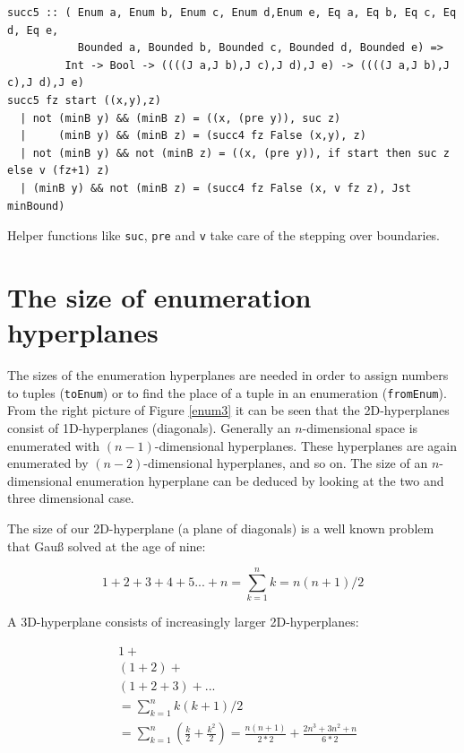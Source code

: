 \documentclass{tmr}
\begin{document}
\begin{Verbatim}
succ5 :: ( Enum a, Enum b, Enum c, Enum d,Enum e, Eq a, Eq b, Eq c, Eq d, Eq e,
           Bounded a, Bounded b, Bounded c, Bounded d, Bounded e) =>
         Int -> Bool -> ((((J a,J b),J c),J d),J e) -> ((((J a,J b),J c),J d),J e)
succ5 fz start ((x,y),z)
  | not (minB y) && (minB z) = ((x, (pre y)), suc z)
  |     (minB y) && (minB z) = (succ4 fz False (x,y), z)
  | not (minB y) && not (minB z) = ((x, (pre y)), if start then suc z else v (fz+1) z)
  | (minB y) && not (minB z) = (succ4 fz False (x, v fz z), Jst minBound)
\end{Verbatim}
Helper functions like \verb|suc|, \verb|pre| and \verb|v| take care of the stepping over boundaries.

\section {The size of enumeration hyperplanes}

The sizes of the enumeration hyperplanes are needed in order to assign numbers to tuples (\verb|toEnum|) or to find the place of a tuple in an enumeration  (\verb|fromEnum|).  From the right picture of Figure \ref{enum3} it can be seen that the 2D-hyperplanes consist of 1D-hyperplanes (diagonals).  Generally an $n$-dimensional space is enumerated with $(n-1)$-dimensional hyperplanes. These hyperplanes are again enumerated by $(n-2)$-dimensional hyperplanes, and so on. The size of an $n$-dimensional enumeration hyperplane can be deduced by looking at the two and three dimensional case.

The size of our 2D-hyperplane (a plane of diagonals) is a well known problem that Gauß solved at the age of nine:

\begin{equation}\label{gauss}
 1+2+3+4+5 ... + n  = \sum_{k=1}^{n} k =  n (n+1)/2
\end{equation}

A 3D-hyperplane consists of increasingly larger 2D-hyperplanes:

\begin{equation} \label{poly3d}
\begin{split}
& 1 +\\
&(1+2) +\\
&(1+2+3) + ... \\
& = \sum_{k=1}^{n}  k (k+1)/2 \\
& = \sum_{k=1}^{n} (\frac{k}{2} + \frac{k^2}{2}) = \frac{ n (n+1) }{2*2} + \frac{2n^3+3n^2+n}{6*2} 
\end{split}
\end{equation}
\end{document}
